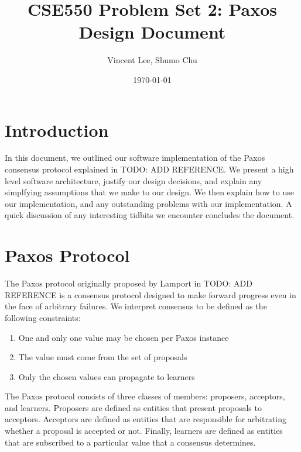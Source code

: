 \documentclass{article}
\begin{document}
\title{CSE550 Problem Set 2: Paxos Design Document}
\author{Vincent Lee, Shumo Chu}
\date{\today}

\maketitle

\tableofcontents


\section{Introduction}

In this document, we outlined our software implementation of the Paxos consensus protocol explained in TODO: ADD REFERENCE.
We present a high level software architecture, justify our design decisions, and explain any simplfying assumptions that we make to our design.
We then explain how to use our implementation, and any outstanding problems with our implementation.
A quick discussion of any interesting tidbits we encounter concludes the document.


\section{Paxos Protocol}

The Paxos protocol originally proposed by Lamport in TODO: ADD REFERENCE is a consensus protocol designed to make forward progress even in the face of arbitrary failures.
We interpret consensus to be defined as the following constraints:

\begin{enumerate}
\item One and only one value may be chosen per Paxos instance
\item The value must come from the set of proposals
\item Only the chosen values can propagate to learners
\end{enumerate}

The Paxos protocol consists of three classes of members: proposers, acceptors, and learners.
Proposers are defined as entities that present proposals to acceptors.
Acceptors are defined as entities that are responsible for arbitrating whether a proposal is accepted or not.
Finally, learners are defined as entities that are subscribed to a particular value that a consensus determines.
\end{document}
